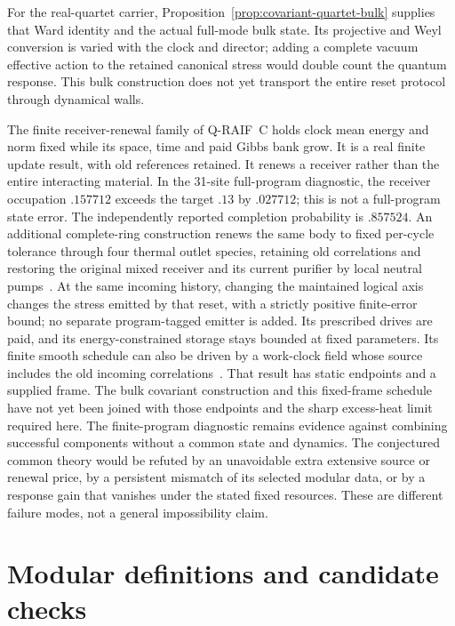 For the real-quartet carrier, Proposition~\ref{prop:covariant-quartet-bulk}
supplies that Ward identity and the actual full-mode bulk state. Its
projective and Weyl conversion is varied with the clock and director;
adding a complete vacuum effective action to the retained canonical
stress would double count the quantum response. This bulk construction
does not yet transport the entire reset protocol through dynamical walls.

The finite receiver-renewal family of Q-RAIF~C holds clock mean energy
and norm fixed while its space, time and paid Gibbs bank grow. It is a
real finite update result, with old references retained. It renews a
receiver rather than the entire interacting material. In the 31-site
full-program diagnostic, the receiver occupation $.157712$ exceeds
the target $.13$ by $.027712$; this is not a full-program state error.
The independently reported completion probability is $.857524$.
An additional complete-ring construction renews the same body to fixed
per-cycle tolerance through four thermal outlet species, retaining old
correlations and restoring the original mixed receiver and its current
purifier by local neutral pumps~\cite{QRC}. At the same incoming
history, changing the maintained logical axis changes the stress
emitted by that reset, with a strictly positive finite-error bound;
no separate program-tagged emitter is added. Its prescribed drives are
paid, and its energy-constrained storage stays bounded at fixed
parameters. Its finite smooth schedule can also be driven by a work-clock
field whose source includes the old incoming correlations~\cite[Section
on a spatial work clock]{QRC}. That result has static endpoints and a
supplied frame. The bulk covariant construction and this fixed-frame
schedule have not yet been joined with those endpoints and the sharp
excess-heat limit required here.
The finite-program diagnostic remains evidence against combining successful
components without a common state and dynamics. The conjectured common theory
would be refuted by an unavoidable extra extensive source or renewal
price, by a persistent mismatch of its selected modular data, or by a
response gain that vanishes under the stated fixed resources. These
are different failure modes, not a general impossibility claim.

\section{Modular definitions and candidate checks}
\label{app:modular-details}

